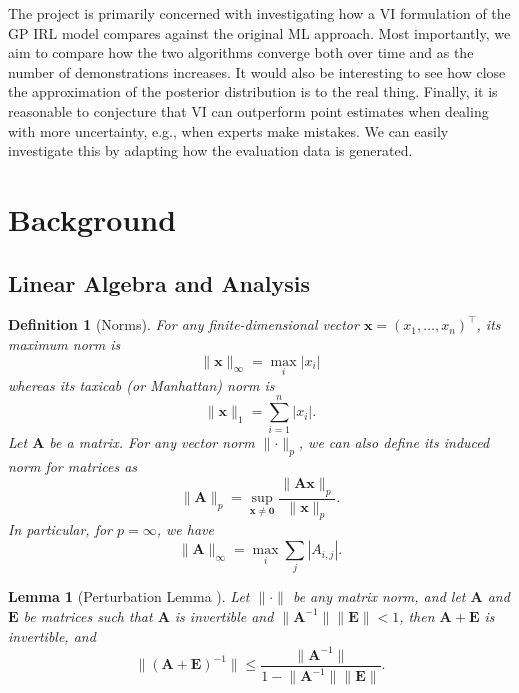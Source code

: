 \documentclass{mpaper}
\newtheorem{lemma}[theorem]{Lemma}
\newtheorem{definition}[theorem]{Definition}
\begin{document}
The project is primarily concerned with investigating how a VI formulation of
the GP IRL model compares against the original ML approach. Most importantly, we
aim to compare how the two algorithms converge both over time and as the number
of demonstrations increases. It would also be interesting to see how close the
approximation of the posterior distribution is to the real thing. Finally, it is
reasonable to conjecture that VI can outperform point estimates when dealing
with more uncertainty, e.g., when experts make mistakes. We can easily
investigate this by adapting how the evaluation data is generated.

\section{Background} \label{sec:background}

\subsection{Linear Algebra and Analysis}

\begin{definition}[Norms]
  For any finite-dimensional vector $\mathbf{x} = (x_1, \dots, x_n)^\intercal$,
  its \emph{maximum norm} is
  \[
    \lVert \mathbf{x} \rVert_\infty = \max_i |x_i|
  \]
  whereas its \emph{taxicab} (or \emph{Manhattan}) \emph{norm} is
  \[
    \lVert \mathbf{x} \rVert_1 = \sum_{i = 1}^n |x_i|.
  \]
  Let $\mathbf{A}$ be a matrix. For any vector norm $\lVert
  \cdot \rVert_p$, we can also define its \emph{induced norm} for matrices as
  \[
    \lVert \mathbf{A} \rVert_p = \sup_{\mathbf{x} \ne \mathbf{0}} \frac{\lVert
      \mathbf{Ax} \rVert_p}{\lVert \mathbf{x} \rVert_p}.
  \]
  In particular, for $p = \infty$, we have
  \[
    \lVert \mathbf{A} \rVert_\infty = \max_i \sum_{j} |A_{i,j}|.
  \]
\end{definition}

\begin{lemma}[Perturbation Lemma
  \cite{layton2014numerical}] \label{prop:condition_number}
  Let $\lVert \cdot \rVert$ be any matrix norm, and let $\mathbf{A}$ and
  $\mathbf{E}$ be matrices such that $\mathbf{A}$ is invertible and $\lVert
  \mathbf{A}^{-1} \rVert \lVert \mathbf{E} \rVert < 1$, then $\mathbf{A} +
  \mathbf{E}$ is invertible, and
  \[
    \lVert (\mathbf{A} + \mathbf{E})^{-1} \rVert \le \frac{\lVert
      \mathbf{A}^{-1} \rVert}{1 - \lVert \mathbf{A}^{-1} \rVert \lVert
      \mathbf{E} \rVert}.
  \]
\end{lemma}
\end{document}
